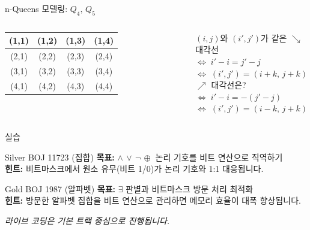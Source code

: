 \documentclass[10.5pt,compress]{beamer}
\begin{document}
\begin{frame}{n-Queens 모델링: $Q_4,\, Q_5$}
\begin{columns}[T]
        \centering
        \setlength{\tabcolsep}{1pt}
        \renewcommand{\arraystretch}{1.3}
        \begin{tabular}{|c|c|c|c|}
            \hline
            \cellcolor{lightblue!80}\tiny(1,1) & \cellcolor{lightgreen!60}\tiny(1,2) & \cellcolor{lightamber!80}\tiny(1,3) & \cellcolor{lightred!60}\tiny(1,4)\\
            \hline
            \cellcolor{accentblue!25}\tiny(2,1) & \cellcolor{lightblue!80}\tiny(2,2) & \cellcolor{lightgreen!60}\tiny(2,3) & \cellcolor{lightamber!80}\tiny(2,4)\\
            \hline
            \cellcolor{navyblue!15}\tiny(3,1) & \cellcolor{accentblue!25}\tiny(3,2) & \cellcolor{lightblue!80}\tiny(3,3) & \cellcolor{lightgreen!60}\tiny(3,4)\\
            \hline
            \cellcolor{gray!25}\tiny(4,1) & \cellcolor{navyblue!15}\tiny(4,2) & \cellcolor{accentblue!25}\tiny(4,3) & \cellcolor{lightblue!80}\tiny(4,4)\\
            \hline
        \end{tabular}
        \renewcommand{\arraystretch}{1}

        \vspace{0.08cm}
        $(i,j)$와 $(i',j')$가 같은 $\searrow$ 대각선\\
        $\Leftrightarrow\; i' - i = j' - j$\\
        $\Leftrightarrow\; (i',j') = (i{+}k,\, j{+}k)$\\[4pt]
        $\nearrow$ 대각선은?\\
        $\Leftrightarrow\; i' - i = -(j' - j)$\\
        $\Leftrightarrow\; (i',j') = (i{-}k,\, j{+}k)$
    \end{columns}
\end{frame}

\begin{frame}[t]{실습}
    
    \vspace{0.12cm}

    \begin{exampleblock}{Silver BOJ 11723 (집합)}
        \footnotesize
        \textbf{목표:} $\land\, \lor\, \neg\, \oplus$ 논리 기호를 비트 연산으로 직역하기\\
        \textbf{힌트:} 비트마스크에서 원소 유무(비트 1/0)가 논리 기호와 1:1 대응됩니다.
    \end{exampleblock}

    \vspace{0.1cm}
    \begin{block}{Gold BOJ 1987 (알파벳)}
        \footnotesize
        \textbf{목표:} $\exists$ 판별과 비트마스크 방문 처리 최적화\\
        \textbf{힌트:} 방문한 알파벳 집합을 비트 연산으로 관리하면 메모리 효율이 대폭 향상됩니다.
    \end{block}
    \vspace{0.15cm}
    \textit{\footnotesize 라이브 코딩은 기본 트랙 중심으로 진행됩니다.}
\end{frame}
\end{document}
